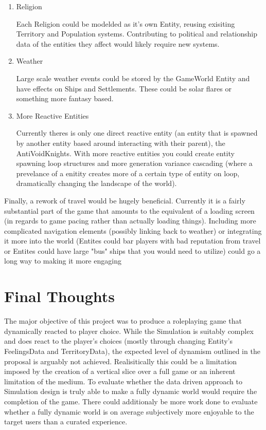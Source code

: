 \documentclass{report}
\begin{document}
\begin{enumerate}

	\item	Religion

Each Religion could be modelded as it's own Entity, reusing exisiting Territory and Population systems. Contributing to political and relationship data of the entities they affect would likely require new systems.
 
	\item Weather

Large scale weather events could be stored by the GameWorld Entity and have effects on Ships and Settlements. These could be solar flares or something more fantasy based.

	\item More Reactive Entities

Currently theres is only one direct reactive entity (an entity that is spawned by another entity based around interacting with their parent), the AntiVoidKnights. With more reactive entities you could create entity spawning loop structures and more generation variance cascading (where a prevelance of a enitity creates more of a certain type of entity on loop, dramatically changing the landscape of the world).

\end{enumerate}

Finally, a rework of travel would be hugely beneficial. Currently it is a fairly substantial part of the game that amounts to the equivalent of a loading screen (in regards to game pacing rather than actually loading things). Including more complicated navigation elements (possibly linking back to weather) or integrating it more into the world (Entites could bar players with bad reputation from travel or Entites could have large "bus" ships that you would need to utilize) could go a long way to making it more engaging


\section{Final Thoughts}

The major objective of this project was to produce a roleplaying game that dynamically reacted to player choice. While the Simulation is suitably complex and does react to the player's choices (mostly through changing Entity's FeelingsData and TerritoryData), the expected level of dynamism outlined in the proposal is arguably not achieved. Realisitically this could be a limitation imposed by the creation of a vertical slice over a full game or an inherent limitation of the medium. To evaluate whether the data driven approach to Simulation design is truly able to make a fully dynamic world would require the completion of the game. There could additionaly be more work done to evaluate whether a fully dynamic world is on average subjectively more enjoyable to the target users than a curated experience. 
\end{document}

